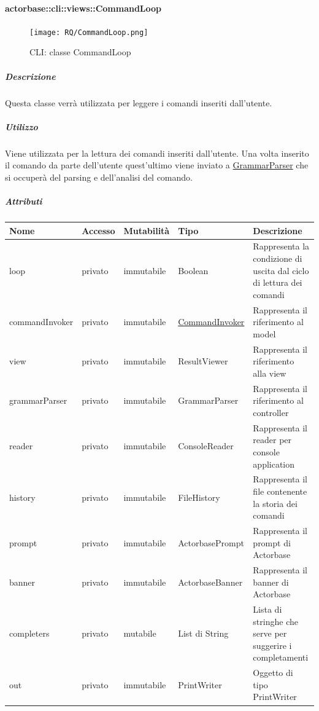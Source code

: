 \documentclass{scalatekids-article}
\begin{document}
\paragraph{actorbase::cli::views::CommandLoop}
\label{sec:actorbase::cli::views::CommandLoop}

\begin{figure}[H]
  \begin{center}
    \texttt{[image: RQ/CommandLoop.png]}
    \caption{CLI: classe CommandLoop}
  \end{center}
\end{figure}

\subparagraph{Descrizione}
Questa classe verrà utilizzata per leggere i comandi inseriti dall'utente.

\subparagraph{Utilizzo}
Viene utilizzata per la lettura dei comandi inseriti dall'utente. Una volta inserito il comando
da parte dell'utente quest'ultimo viene inviato a \hyperref[sec:actorbase::cli::controllers::GrammarParser]{GrammarParser}
che si occuperà del parsing e dell'analisi del comando.

\subparagraph{Attributi}
\begin{tabular}{| p{2.7cm} | p{1.5cm} | p{2cm} | p{2.7cm} | p{8cm} |}
  \hline
  Nome & Accesso & Mutabilità & Tipo & Descrizione\\
  \hline
  loop & privato & immutabile & Boolean & Rappresenta la condizione di uscita dal ciclo di lettura dei comandi\\
  \hline
  commandInvoker & privato & immutabile & \hyperref[sec:actorbase::cli::models::CommandInvoker]{CommandInvoker} & Rappresenta il riferimento al model\\
  \hline
  view & privato & immutabile & ResultViewer & Rappresenta il riferimento alla view\\
  \hline
  grammarParser & privato & immutabile & GrammarParser & Rappresenta il riferimento al controller\\
  \hline
  reader & privato & immutabile & ConsoleReader & Rappresenta il reader per console application \\
  \hline
  history & privato & immutabile & FileHistory & Rappresenta il file contenente la storia dei comandi\\
  \hline
  prompt & privato & immutabile & ActorbasePrompt & Rappresenta il prompt di Actorbase\\
  \hline
  banner & privato & immutabile & ActorbaseBanner & Rappresenta il banner di Actorbase\\
  \hline
  completers & privato & mutabile & List di String & Lista di stringhe che serve per suggerire i completamenti\\
  \hline
  out & privato & immutabile & PrintWriter & Oggetto di tipo PrintWriter\\
  \hline
\end{tabular}
\end{document}
